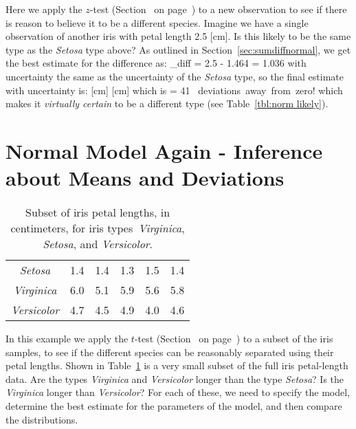 
Here we apply the $z$-test (Section~\emph{} on page~\pageref{sec:ztest}) to a new observation to see if there is reason to believe it to be a different species.  Imagine we have a single observation of another iris with petal length 2.5 [cm].  Is this likely to be the same type as the {\em Setosa} type above?    As outlined in Section~\ref{sec:sumdiffnormal}, we get the best estimate for the difference as:
\beqn
\mu_{\rm diff} = 2.5 - 1.464 = 1.036
\eeqn
with uncertainty the same as the uncertainty of the {\em Setosa} type, so the final estimate with uncertainty is:
 [{\rm cm}]  [{\rm cm}]
\eeqn
which is 
\beqn
{} = 41 \mbox{ deviations away from zero!}
\eeqn
which makes it \emph{virtually certain} to be a different type (see Table~\ref{tbl:norm likely}).


\section{Normal Model Again - Inference about Means and Deviations}

\begin{table}
\begin{center}
\begin{tabular}{cccccc}
\toprule
{\it Setosa} &1.4& 1.4& 1.3& 1.5& 1.4\\
{\it Virginica} & 6.0& 5.1& 5.9& 5.6& 5.8\\
{\it Versicolor} &4.7& 4.5& 4.9& 4.0& 4.6\\
\bottomrule
\end{tabular}
\end{center}
\label{tbl:iris_length2}
\caption{Subset of iris petal lengths, in centimeters, for iris types~\emph{Virginica}, \emph{Setosa}, and \emph{Versicolor}.}
\end{table}


In this example we apply the $t$-test (Section~\emph{} on page~\pageref{sec:ttest}) to a subset of the iris samples, to see if the different species can be reasonably separated using their petal lengths.  Shown in Table~\ref{tbl:iris_length2} is a very small subset of the full iris petal-length data.  Are the types \emph{Virginica} and \emph{Versicolor} longer than the type \emph{Setosa}?  Is the \emph{Virginica} longer than \emph{Versicolor}?  For each of these, we need to specify the model, determine the best estimate for the parameters of the model, and then compare the distributions.


